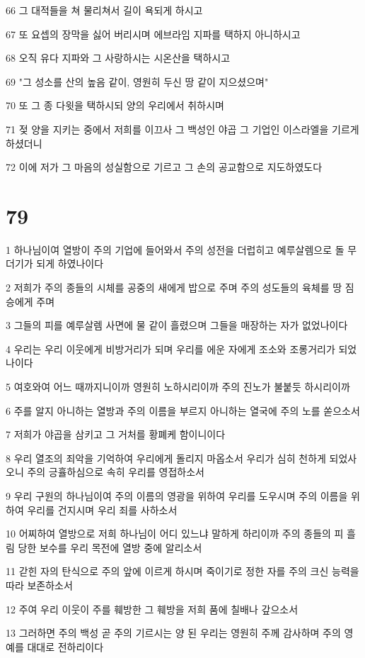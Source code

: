 \par 66 그 대적들을 쳐 물리쳐서 길이 욕되게 하시고
\par 67 또 요셉의 장막을 싫어 버리시며 에브라임 지파를 택하지 아니하시고
\par 68 오직 유다 지파와 그 사랑하시는 시온산을 택하시고
\par 69 "그 성소를 산의 높음 같이, 영원히 두신 땅 같이 지으셨으며"
\par 70 또 그 종 다윗을 택하시되 양의 우리에서 취하시며
\par 71 젖 양을 지키는 중에서 저희를 이끄사 그 백성인 야곱 그 기업인 이스라엘을 기르게 하셨더니
\par 72 이에 저가 그 마음의 성실함으로 기르고 그 손의 공교함으로 지도하였도다

\chapter{79}

\par 1 하나님이여 열방이 주의 기업에 들어와서 주의 성전을 더럽히고 예루살렘으로 돌 무더기가 되게 하였나이다
\par 2 저희가 주의 종들의 시체를 공중의 새에게 밥으로 주며 주의 성도들의 육체를 땅 짐승에게 주며
\par 3 그들의 피를 예루살렘 사면에 물 같이 흘렸으며 그들을 매장하는 자가 없었나이다
\par 4 우리는 우리 이웃에게 비방거리가 되며 우리를 에운 자에게 조소와 조롱거리가 되었나이다
\par 5 여호와여 어느 때까지니이까 영원히 노하시리이까 주의 진노가 불붙듯 하시리이까
\par 6 주를 알지 아니하는 열방과 주의 이름을 부르지 아니하는 열국에 주의 노를 쏟으소서
\par 7 저희가 야곱을 삼키고 그 거처를 황폐케 함이니이다
\par 8 우리 열조의 죄악을 기억하여 우리에게 돌리지 마옵소서 우리가 심히 천하게 되었사오니 주의 긍휼하심으로 속히 우리를 영접하소서
\par 9 우리 구원의 하나님이여 주의 이름의 영광을 위하여 우리를 도우시며 주의 이름을 위하여 우리를 건지시며 우리 죄를 사하소서
\par 10 어찌하여 열방으로 저희 하나님이 어디 있느냐 말하게 하리이까 주의 종들의 피 흘림 당한 보수를 우리 목전에 열방 중에 알리소서
\par 11 갇힌 자의 탄식으로 주의 앞에 이르게 하시며 죽이기로 정한 자를 주의 크신 능력을 따라 보존하소서
\par 12 주여 우리 이웃이 주를 훼방한 그 훼방을 저희 품에 칠배나 갚으소서
\par 13 그러하면 주의 백성 곧 주의 기르시는 양 된 우리는 영원히 주께 감사하며 주의 영예를 대대로 전하리이다

